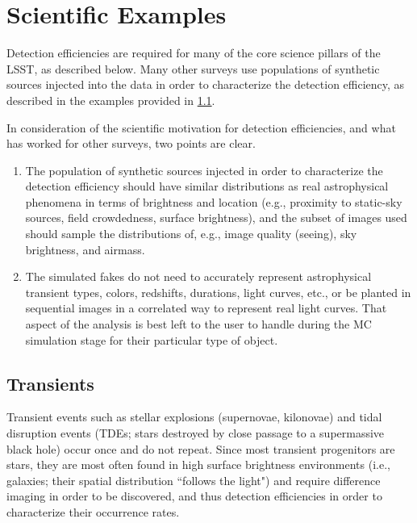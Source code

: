 \section{Scientific Examples}\label{sec:sci}

Detection efficiencies are required for many of the core science pillars of the LSST, as described below.
Many other surveys use populations of synthetic sources injected into the data in order to characterize the detection efficiency, as described in the examples provided in \ref{ssec:sci_trans}.

In consideration of the scientific motivation for detection efficiencies, and what has worked for other surveys, two points are clear.

\begin{enumerate}

\item The population of synthetic sources injected in order to characterize the detection efficiency should have similar distributions as real astrophysical phenomena in terms of brightness and location (e.g., proximity to static-sky sources, field crowdedness, surface brightness), and the subset of images used should sample the distributions of, e.g., image quality (seeing), sky brightness, and airmass. 

\item The simulated fakes do not need to accurately represent astrophysical transient types, colors, redshifts, durations, light curves, etc., or be planted in sequential images in a correlated way to represent real light curves.
That aspect of the analysis is best left to the user to handle during the MC simulation stage for their particular type of object.

\end{enumerate}

\subsection{Transients}\label{ssec:sci_trans}

Transient events such as stellar explosions (supernovae, kilonovae) and tidal disruption events (TDEs; stars destroyed by close passage to a supermassive black hole) occur once and do not repeat.
Since most transient progenitors are stars, they are most often found in high surface brightness environments (i.e., galaxies; their spatial distribution ``follows the light") and require difference imaging in order to be discovered, and thus detection efficiencies in order to characterize their occurrence rates.

